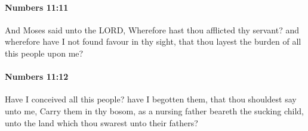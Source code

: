 		\paragraph{Numbers 11:11} %
			\label{NUMBERS-11-11}

			And Moses said unto the LORD, Wherefore hast thou afflicted thy servant? and wherefore have I not found favour in thy sight, that thou layest the burden of all this people upon me?


		\paragraph{Numbers 11:12} %
			\label{NUMBERS-11-12}

			Have I conceived all this people? have I begotten them, that thou shouldest say unto me, Carry them in thy bosom, as a nursing father beareth the sucking child, unto the land which thou swarest unto their fathers?

